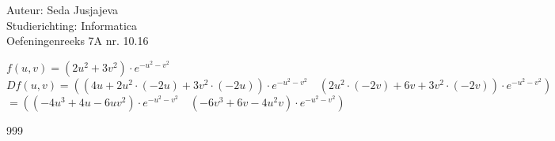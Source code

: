 \documentclass[a4paper]{article}
\begin{document}
\noindent \large Auteur: Seda Jusjajeva\\
\noindent \large Studierichting: Informatica\\
\noindent \large Oefeningenreeks 7A nr. 10.16\\

\medskip

\normalsize


$f(u, v) = (2u^2 + 3v^2)\cdot e^{-u^2 - v^2}$ \\

$Df(u, v) = \left(\left(4u + 2u^2\cdot(-2u) + 3v^2\cdot(-2u)\right)\cdot e^{-u^2-v^2} \quad \left(2u^2\cdot(-2v) + 6v + 3v^2\cdot(-2v)\right)\cdot e^{-u^2 - v^2}\right)$ \\

$= \left((-4u^3 + 4u - 6uv^2)\cdot e^{-u^2 - v^2} \quad (-6v^3 + 6v - 4u^2v)\cdot e^{-u^2 - v^2}\right)$ \\


\begin{thebibliography}{999}
\end{thebibliography}
\end{document}

